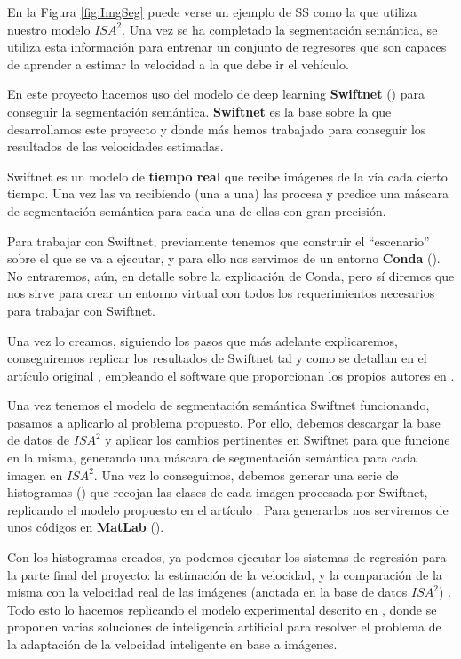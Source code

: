 En la Figura \ref{fig:ImgSeg} puede verse un ejemplo de \ac{SS} como la que utiliza nuestro modelo $ISA^{2}$. Una vez se ha completado la segmentación semántica, se utiliza esta información para entrenar un conjunto de regresores que son capaces de aprender a estimar la velocidad a la que debe ir el vehículo.

En este proyecto hacemos uso del modelo de deep learning \textbf{Swiftnet} (\cite{swiftnet}) para conseguir la segmentación semántica. \textbf{Swiftnet} es la base sobre la que desarrollamos este proyecto y donde más hemos trabajado para conseguir los resultados de las velocidades estimadas.

Swiftnet es un modelo de \textbf{tiempo real} que recibe imágenes de la vía cada cierto tiempo. Una vez las va recibiendo (una a una) las procesa y predice una máscara de segmentación semántica para cada una de ellas con gran precisión.

Para trabajar con Swiftnet, previamente tenemos que construir el ``escenario'' sobre el que se va a ejecutar, y para ello nos servimos de un entorno \textbf{Conda} (\cite{conda}). No entraremos, aún, en detalle sobre la explicación de Conda, pero sí diremos que nos sirve para crear un entorno virtual con todos los requerimientos necesarios para trabajar con Swiftnet.

Una vez lo creamos, siguiendo los pasos que más adelante explicaremos, conseguiremos replicar los resultados de Swiftnet tal y como se detallan en el artículo original \cite{swiftnet}, empleando el software que proporcionan los propios autores en \cite{github_swiftnet}.


Una vez tenemos el modelo de segmentación semántica Swiftnet funcionando, pasamos a aplicarlo al problema propuesto. Por ello, debemos descargar la base de datos de $ISA^{2}$ y aplicar los cambios pertinentes en Swiftnet para que funcione en la misma, generando una máscara de segmentación semántica para cada imagen en $ISA^{2}$. Una vez lo conseguimos, debemos generar una serie de histogramas (\cite{histograma}) que recojan las clases de cada imagen procesada por Swiftnet, replicando el modelo propuesto en el artículo \cite{isa2}. Para generarlos nos serviremos de unos códigos en \textbf{MatLab} (\cite{matlab}).

Con los histogramas creados, ya podemos ejecutar los sistemas de regresión para la parte final del proyecto: la estimación de la velocidad, y la comparación de la misma con la velocidad real de las imágenes (anotada en la base de datos $ISA^{2}$) . Todo esto lo hacemos replicando el modelo experimental descrito en \cite{isa2}, donde se proponen varias soluciones de inteligencia artificial para resolver el problema de la adaptación de la velocidad inteligente en base a imágenes.


